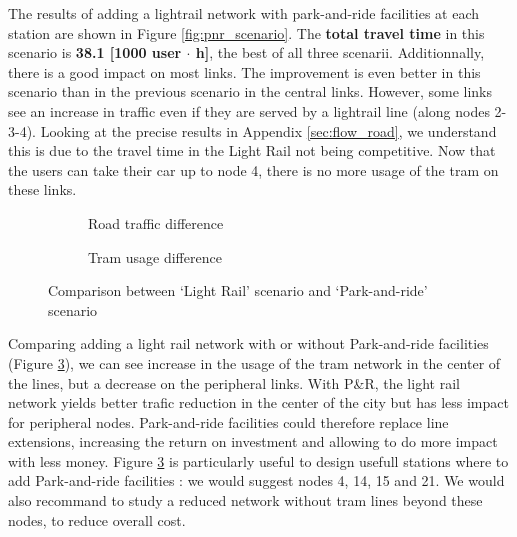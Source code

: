 The results of adding a lightrail network with park-and-ride facilities at each station are shown in Figure \ref{fig:pnr_scenario}. The \textbf{total travel time} in this scenario is \textbf{38.1 [1000 user $\cdot$ h]}, the best of all three scenarii. Additionnally, there is a good impact on most links. The improvement is even better in this scenario than in the previous scenario in the central links. However, some links see an increase in traffic even if they are served by a lightrail line (along nodes 2-3-4). Looking at the precise results in Appendix \ref{sec:flow_road}, we understand this is due to the travel time in the Light Rail not being competitive. Now that the users can take their car up to node 4, there is no more usage of the tram on these links.


\begin{figure}
    \centering
    \begin{subfigure}{0.33\textwidth}
        \centering
        \resizebox{\textwidth}{!}{}
        \caption{Road traffic difference}
        \label{fig:diff_sc23}
    \end{subfigure}%
    \begin{subfigure}{0.33\textwidth}
        \centering
        \resizebox{\textwidth}{!}{}
        \caption{Tram usage difference}
        \label{fig:diff_tram_sc23}
    \end{subfigure}
    \caption{Comparison between `Light Rail' scenario and `Park-and-ride' scenario}
    \label{fig:comp_sc23}
\end{figure}

Comparing adding a light rail network with or without Park-and-ride facilities (Figure \ref{fig:comp_sc23}), we can see increase in the usage of the tram network in the center of the lines, but a decrease on the peripheral links. With P\&R, the light rail network yields better trafic reduction in the center of the city but has less impact for peripheral nodes. Park-and-ride facilities could therefore replace line extensions, increasing the return on investment and allowing to do more impact with less money. Figure \ref{fig:comp_sc23} is particularly useful to design usefull stations where to add Park-and-ride facilities : we would suggest nodes 4, 14, 15 and 21. We would also recommand to study a reduced network without tram lines beyond these nodes, to reduce overall cost.